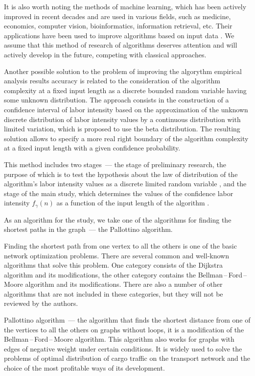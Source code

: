 \documentclass[a4paper]{article}
\begin{document}
It is also worth noting the methods of machine learning, which has been actively improved in recent decades and are used in various fields, such as medicine, economics, computer vision, bioinformatics, information retrieval, etc. Their applications have been used to improve algorithms based on input data \cite{berube}. We assume that this method of research of algorithms deserves attention and will actively develop in the future, competing with classical approaches.

Another possible solution to the problem of improving the algorythm empirical analysis results accuracy is related to the consideration of the algorithm complexity at a fixed input length as a discrete bounded random variable having some unknown distribution. The approach consists in the construction of a confidence interval of labor intensity based on the approximation of the unknown discrete distribution of labor intensity values by a continuous distribution with limited variation, which is proposed to use the beta distribution. The resulting solution allows to specify a more real right boundary of the algorithm complexity at a fixed input length with a given confidence probability.

This method includes two stages~--- the stage of preliminary research, the purpose of which is to test the hypothesis about the law of distribution of the algorithm's labor intensity values as a discrete limited random variable \cite{petrushyn_ulyanov_planning}, and the stage of the main study, which determines the values of the confidence labor intensity $f_\gamma(n)$ as a function of the input length of the algorithm \cite{petrushyn_ulyanov_analysis}.

As an algorithm for the study, we take one of the algorithms for finding the shortest paths in the graph~--- the Pallottino algorithm.

Finding the shortest path from one vertex to all the others is one of the basic network optimization problems. There are several common and well-known algorithms that solve this problem. One category consists of the Dijkstra algorithm \cite{dijkstra} and its modifications, the other category contains the Bellman\,--\,Ford\,--\,Moore algorithm \cite{bellman, ford, moore} and its modifications. There are also a number of other algorithms that are not included in these categories, but they will not be reviewed by the authors.

Pallottino algorithm~--- the algorithm that finds the shortest distance from one of the vertices to all the others on graphs without loops, it is a modification of the Bellman\,--\,Ford\,--\,Moore algorithm. This algorithm also works for graphs with edges of negative weight under certain conditions. It is widely used to solve the problems of optimal distribution of cargo traffic on the transport network and the choice of the most profitable ways of its development.
\end{document}
